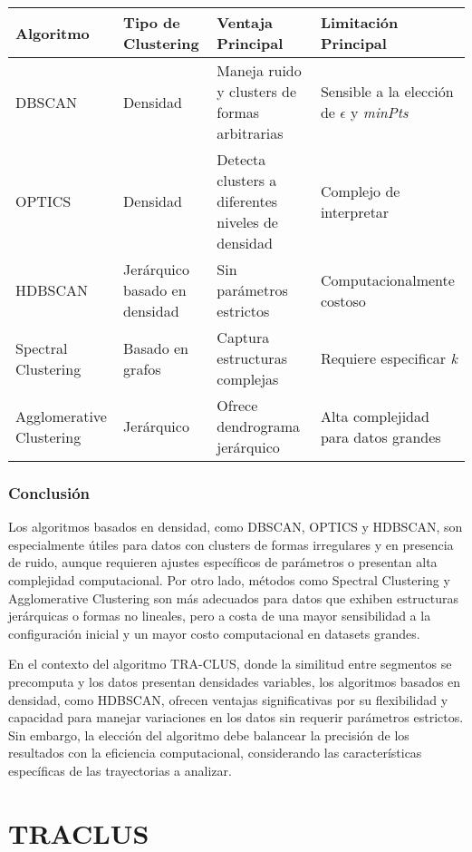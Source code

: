 \begin{table}[ht]
\centering
\begin{tabular}{|p{2.5cm}|p{3.7cm}|p{3.7cm}|p{4cm}|}
\hline
\textbf{Algoritmo} & \textbf{Tipo de Clustering} & \textbf{Ventaja Principal} & \textbf{Limitación Principal} \\
\hline
DBSCAN & Densidad & Maneja ruido y clusters de formas arbitrarias & Sensible a la elección de \(\epsilon\) y \textit{minPts} \\
OPTICS & Densidad & Detecta clusters a diferentes niveles de densidad & Complejo de interpretar \\
HDBSCAN & Jerárquico basado en densidad & Sin parámetros estrictos & Computacionalmente costoso \\
Spectral Clustering & Basado en grafos & Captura estructuras complejas & Requiere especificar \textit{k} \\
Agglomerative Clustering & Jerárquico & Ofrece dendrograma jerárquico & Alta complejidad para datos grandes \\
\hline
\end{tabular}
\end{table}

\subsubsection*{Conclusión}

Los algoritmos basados en densidad, como DBSCAN, OPTICS y HDBSCAN, son especialmente útiles para datos con clusters de formas irregulares y en presencia de ruido, aunque requieren ajustes específicos de parámetros o presentan alta complejidad computacional. Por otro lado, métodos como Spectral Clustering y Agglomerative Clustering son más adecuados para datos que exhiben estructuras jerárquicas o formas no lineales, pero a costa de una mayor sensibilidad a la configuración inicial y un mayor costo computacional en datasets grandes.

En el contexto del algoritmo TRA-CLUS, donde la similitud entre segmentos se precomputa y los datos presentan densidades variables, los algoritmos basados en densidad, como HDBSCAN, ofrecen ventajas significativas por su flexibilidad y capacidad para manejar variaciones en los datos sin requerir parámetros estrictos. Sin embargo, la elección del algoritmo debe balancear la precisión de los resultados con la eficiencia computacional, considerando las características específicas de las trayectorias a analizar.


\section{TRACLUS}

